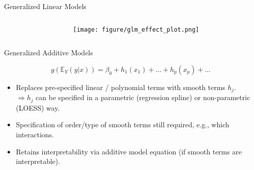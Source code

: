 \documentclass[10pt,compress,t,notes=noshow, xcolor=table]{beamer}
\begin{document}
\begin{frame}{Generalized Linear Models}
\begin{columns}[T]
\begin{column}{0.55\textwidth}
\tiny

\end{column}
\begin{column}{0.45\textwidth}  %
  \texttt{[image: figure/glm\_effect\_plot.png]}
\end{column}
\end{columns}
\end{frame}

\begin{frame}{Generalized Additive Models}

$$
g\left(\mathbb{E}_Y(y \vert x)\right) = \beta_0 + h_1(x_1) + \dots + h_p(x_p) + \dots
$$
\begin{itemize}
\item Replaces pre-specified linear / polynomial terms with smooth terms $h_j$.\\
$\Rightarrow h_j$ can be specified in a parametric (regression spline) or non-parametric (LOESS) way.
\item Specification of order/type of smooth terms still required, e.g., which interactions.
\item Retains interpretability via additive model equation (if smooth terms are interpretable).
\end{itemize}
\end{frame}
\end{document}
